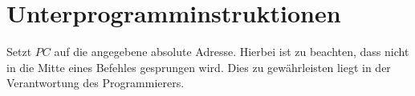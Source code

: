 \section{Unterprogramminstruktionen}

Setzt $PC$ auf die angegebene absolute Adresse. Hierbei ist zu beachten,  dass
nicht in die Mitte eines Befehles gesprungen wird. Dies zu gewährleisten liegt
in der Verantwortung des Programmierers.






